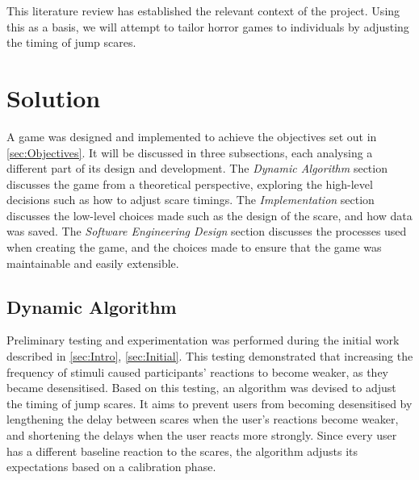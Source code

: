 \documentclass[12pt,a4paper]{article}\usepackage[]{graphicx}\usepackage[]{color}
\begin{document}
This literature review has established the relevant context of the project.
Using this as a basis, we will attempt to tailor horror games to individuals by adjusting the timing of jump scares.

\section{Solution}

A game was designed and implemented to achieve the objectives set out in \cref{sec:Objectives}.
It will be discussed in three subsections, each analysing a different part of its design and development.
The \emph{Dynamic Algorithm} section discusses the game from a theoretical perspective, exploring the high-level decisions such as how to adjust scare timings.
The \emph{Implementation} section discusses the low-level choices made such as the design of the scare, and how data was saved.
The \emph{Software Engineering Design} section discusses the processes used when creating the game, and the choices made to ensure that the game was maintainable and easily extensible.

\subsection{Dynamic Algorithm}

Preliminary testing and experimentation was performed during the initial work described in \cref{sec:Intro}, \vref{sec:Initial}.
This testing demonstrated that increasing the frequency of stimuli caused participants' reactions to become weaker, as they became desensitised.
Based on this testing, an algorithm was devised to adjust the timing of jump scares.
It aims to prevent users from becoming desensitised by lengthening the delay between scares when the user's reactions become weaker, and shortening the delays when the user reacts more strongly.
Since every user has a different baseline reaction to the scares, the algorithm adjusts its expectations based on a calibration phase.
\end{document}
